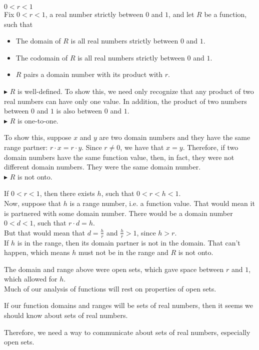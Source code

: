 \documentclass{ximera}
\begin{document}
\begin{example} $0 < r < 1$ \\
Fix $0 < r < 1$, a real number strictly between $0$ and $1$, and let $R$ be a function, such that

\begin{itemize}
\item The domain of $R$ is all real numbers strictly between $0$ and $1$.  \\ 
\item The codomain of $R$ is all real numbers strictly between $0$ and $1$.  \\
\item $R$ pairs a domain number with its product with $r$.
\end{itemize}





$\blacktriangleright$ $R$ is well-defined.  To show this, we need only recognize that any product of two real numbers can have only one value.  In addition, the product of two numbers between $0$ and $1$ is also between $0$ and $1$.  \\


$\blacktriangleright$ $R$ is one-to-one. 

To show this, suppose $x$ and $y$ are two domain numbers and they have the same range partner: $r \cdot x = r \cdot y$.  Since $r \ne 0$, we have that $x = y$. Therefore, if two domain numbers have the same function value, then, in fact, they were not different domain numbers.  They were the same domain number. \\


$\blacktriangleright$ $R$ is not onto.

If $0 < r < 1$, then there exists $h$, such that $0 < r < h < 1$.  \\

Now, suppose that $h$ is a range number, i.e. a function value. That would mean it is partnered with some domain number.  There would be a domain number $0 < d < 1$, such that  $r \cdot d = h$.  \\


But that would mean that $d = \frac{h}{r}$ and $\frac{h}{r} > 1$, since $h > r$.  \\


If $h$ is in the range, then its domain partner is not in the domain.  That can't happen, which means $h$ must not be in the range and $R$ is not onto.





\end{example} 

The domain and range above were open sets, which gave space between $r$ and $1$, which allowed for $h$. \\

Much of our analysis of functions will rest on properties of open sets. \


If our function domains and ranges will be sets of real numbers, then it seems we should know about sets of real numbers.

Therefore, we need a way to communicate about sets of real numbers, especially open sets.
\end{document}
